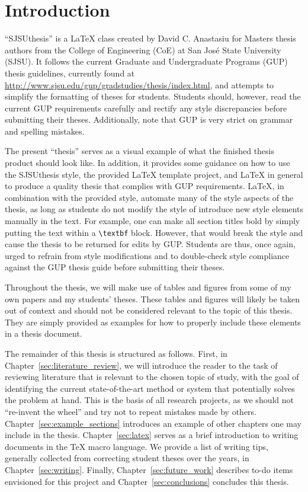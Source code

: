\section{Introduction}\label{sec:introduction}
``SJSUthesis'' is a LaTeX class created by David C. Anastasiu for Masters thesis authors from the College of Engineering (CoE) at San Jos\'{e} State University (SJSU). It follows the current Graduate and Undergraduate Programs (GUP) thesis guidelines, currently found at \url{http://www.sjsu.edu/gup/gradstudies/thesis/index.html}, and attempts to simplify the formatting of theses for students. Students should, however, read the current GUP requirements carefully and rectify any style discrepancies before submitting their theses. Additionally, note that GUP is very strict on grammar and spelling mistakes.

The present ``thesis'' serves as a visual example of what the finished thesis product should look like. In addition, it provides some guidance on how to use the SJSUthesis style, the provided LaTeX template project, and LaTeX in general to produce a quality thesis that complies with GUP requirements. LaTeX, in combination with the provided style, automate many of the style aspects of the thesis, as long as students do not modify the style of introduce new style elements manually in the text. For example, one can make all section titles bold by simply putting the text within a \texttt{{\textbackslash}textbf} block. However, that would break the style and cause the thesis to be returned for edits by GUP. Students are thus, once again, urged to refrain from style modifications and to double-check style compliance against the GUP thesis guide before submitting their theses.

Throughout the thesis, we will make use of tables and figures from some of my own papers and my students' theses. These tables and figures will likely be taken out of context and should not be considered relevant to the topic of this thesis. They are simply provided as examples for how to properly include these elements in a thesis document.

The remainder of this thesis is structured as follows. First, in Chapter~\ref{sec:literature_review}, we will introduce the reader to the task of reviewing literature that is relevant to the chosen topic of study, with the goal of identifying the current state-of-the-art method or system that potentially solves the problem at hand. This is the basis of all research projects, as we should not ``re-invent the wheel'' and try not to repeat mistakes made by others. Chapter~\ref{sec:example_sections} introduces an example of other chapters one may include in the thesis. Chapter~\ref{sec:latex} serves as a brief introduction to writing documents in the TeX macro language. We provide a list of writing tips, generally collected from correcting student theses over the years, in Chapter~\ref{sec:writing}. Finally, Chapter~\ref{sec:future_work} describes to-do items envisioned for this project and Chapter~\ref{sec:conclusions} concludes this thesis.

